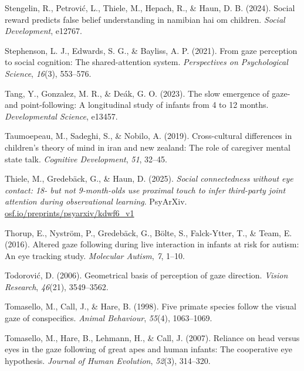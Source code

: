 \documentclass[
  man,floatsintext]{apa7}
\newlength{\cslhangindent}
\newenvironment{CSLReferences}[2] %
 {\begin{list}{}{%
  \setlength{\itemindent}{0pt}
  \setlength{\leftmargin}{0pt}
  \setlength{\parsep}{0pt}
  \ifodd #1
   \setlength{\leftmargin}{\cslhangindent}
   \setlength{\itemindent}{-1\cslhangindent}
  \fi
  \setlength{\itemsep}{#2\baselineskip}}}
 {\end{list}}
\begin{document}
\begin{CSLReferences}{1}{0}
Stengelin, R., Petrović, L., Thiele, M., Hepach, R., \& Haun, D. B. (2024). Social reward predicts false belief understanding in namibian hai\textbar\textbar{} om children. \emph{Social Development}, e12767.

Stephenson, L. J., Edwards, S. G., \& Bayliss, A. P. (2021). From gaze perception to social cognition: The shared-attention system. \emph{Perspectives on Psychological Science}, \emph{16}(3), 553--576.

Tang, Y., Gonzalez, M. R., \& Deák, G. O. (2023). The slow emergence of gaze-and point-following: A longitudinal study of infants from 4 to 12 months. \emph{Developmental Science}, e13457.

Taumoepeau, M., Sadeghi, S., \& Nobilo, A. (2019). Cross-cultural differences in children's theory of mind in iran and new zealand: The role of caregiver mental state talk. \emph{Cognitive Development}, \emph{51}, 32--45.

Thiele, M., Gredebäck, G., \& Haun, D. (2025). \emph{Social connectedness without eye contact: 18- but not 9-month-olds use proximal touch to infer third-party joint attention during observational learning}. PsyArXiv. \href{https://osf.io/preprints/psyarxiv/kdwf6_v1}{osf.io/preprints/psyarxiv/kdwf6\_v1}

Thorup, E., Nyström, P., Gredebäck, G., Bölte, S., Falck-Ytter, T., \& Team, E. (2016). Altered gaze following during live interaction in infants at risk for autism: An eye tracking study. \emph{Molecular Autism}, \emph{7}, 1--10.

Todorović, D. (2006). Geometrical basis of perception of gaze direction. \emph{Vision Research}, \emph{46}(21), 3549--3562.

Tomasello, M., Call, J., \& Hare, B. (1998). Five primate species follow the visual gaze of conspecifics. \emph{Animal Behaviour}, \emph{55}(4), 1063--1069.

Tomasello, M., Hare, B., Lehmann, H., \& Call, J. (2007). Reliance on head versus eyes in the gaze following of great apes and human infants: The cooperative eye hypothesis. \emph{Journal of Human Evolution}, \emph{52}(3), 314--320.


\end{CSLReferences}
\end{document}
